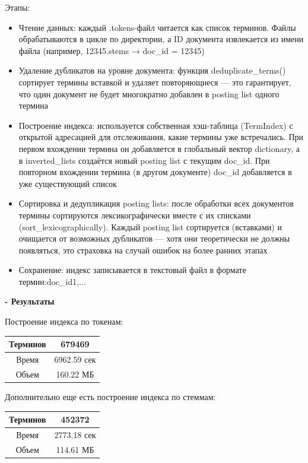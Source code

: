 \documentclass[pdf, unicode, 12pt, a4paper, oneside, fleqn]{article}
\begin{document}
Этапы:
\begin{itemize}
    \item Чтение данных: каждый .tokens-файл читается как список терминов. Файлы обрабатываются в цикле по директории, а ID документа извлекается из имени файла (например, 12345.stems → doc\_id = 12345)
    \item Удаление дубликатов на уровне документа: функция deduplicate\_terms() сортирует термины вставкой и удаляет повторяющиеся — это гарантирует, что один документ не будет многократно добавлен в posting list одного термина
    \item Построение индекса: используется собственная хэш-таблица (TermIndex) с открытой адресацией для отслеживания, какие термины уже встречались. При первом вхождении термина он добавляется в глобальный вектор dictionary, а в inverted\_lists создаётся новый posting list с текущим doc\_id. При повторном вхождении термина (в другом документе) doc\_id добавляется в уже существующий список
    \item Сортировка и дедупликация posting lists: после обработки всех документов термины сортируются лексикографически вместе с их списками (sort\_lexicographically). Каждый posting list сортируется (вставками) и очищается от возможных дубликатов — хотя они теоретически не должны появляться, это страховка на случай ошибок на более ранних этапах
    \item Сохранение: индекс записывается в текстовый файл в формате термин:doc\_id1,...
\end{itemize}

\textbf{- Результаты} 

Построение индекса по токенам:

\begin{center}
\begin{tabular}{ |c|c| }
\hline
 Терминов & 679469 \\
 \hline
 Время & 6962.59 сек \\
 \hline
 Объем & 160.22 МБ \\
 \hline
\end{tabular}
\end{center} 

Дополнительно еще есть построение индекса по стеммам:

\begin{center}
\begin{tabular}{ |c|c| }
\hline
 Терминов & 452372 \\
 \hline
 Время & 2773.18 сек \\
 \hline
 Объем & 114.61 МБ \\
 \hline
\end{tabular}
\end{center} 
\end{document}
